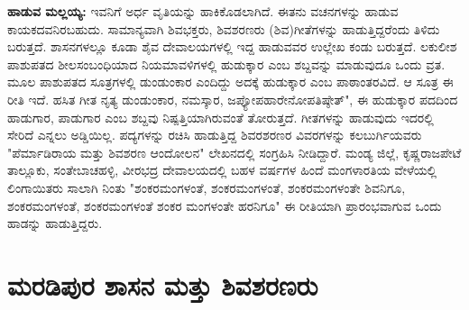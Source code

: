\textbf{ಹಾಡುವ ಮಲ್ಲಯ್ಯ:} ಇವನಿಗೆ ಅರ್ಧ ವೃತಿಯನ್ನು ಹಾಕಿಕೊಡಲಾಗಿದೆ. ಈತನು ವಚನಗಳನ್ನು ಹಾಡುವ ಕಾಯಕದವನಿರಬಹುದು. ಸಾಮಾನ್ಯವಾಗಿ ಶಿವಭಕ್ತರು, ಶಿವಶರಣರು (ಶಿವ)ಗೀತೆಗಳನ್ನು ಹಾಡುತ್ತಿದ್ದರೆಂದು ತಿಳಿದು ಬರುತ್ತದೆ. ಶಾಸನಗಳಲ್ಲೂ ಕೂಡಾ ಶೈವ ದೇವಾಲಯಗಳಲ್ಲಿ ಇದ್ದ ಹಾಡುವವರ ಉಲ್ಲೇಖ ಕಂಡು ಬರುತ್ತದೆ. ಲಕುಲೀಶ ಪಾಶುಪತದ ಶೀಲಸಂಬಂಧಿಯಾದ ನಿಯಮಾವಳಿಗಳಲ್ಲಿ ಹುಡುಕ್ಕಾರ ಎಂಬ ಶಬ್ದವನ್ನು ಮಾಡುವುದೂ ಒಂದು ವ್ರತ. ಮೂಲ ಪಾಶುಪತದ ಸೂತ್ರಗಳಲ್ಲಿ ಡುಂಡುಂಕಾರ ಎಂದಿದ್ದು ಅದಕ್ಕೆ ಹುಡುಕ್ಕಾರ ಎಂಬ ಪಾಠಾಂತರವಿದೆ. ಆ ಸೂತ್ರ ಈ ರೀತಿ ಇದೆ. ಹಸಿತ ಗೀತ ನೃತ್ಯ ಡುಂಡುಂಕಾರ, ನಮಸ್ಕಾರ, ಜಪ್ಯೋಪಹಾರೇನೋಪತಿಷ್ಠೇತ್​", ಈ ಹುಡುಕ್ಕಾರ ಪದದಿಂದ ಹಾಡುಗಾರ, ಪಾಡುಗಾರ ಎಂಬ ಶಬ್ದವು ನಿಷ್ಪತ್ತಿಯಾಗಿರುವಂತೆ ತೋರುತ್ತದೆ. ಗೀತಗಳನ್ನು ಹಾಡುವುದು ಇದರಲ್ಲಿ ಸೇರಿದೆ ಎನ್ನಲು ಅಡ್ಡಿಯಿಲ್ಲ. ಪದ್ಯಗಳನ್ನು ರಚಿಸಿ ಹಾಡುತ್ತಿದ್ದ ಶಿವರಶರಣರ ವಿವರಗಳನ್ನು ಕಲಬುರ್ಗಿಯವರು "ಪೆರ್ಮಾಡಿರಾಯ ಮತ್ತು ಶಿವಶರಣ ಆಂದೋಲನ" ಲೇಖನದಲ್ಲಿ ಸಂಗ್ರಹಿಸಿ ನೀಡಿದ್ದಾರೆ. ಮಂಡ್ಯ ಜಿಲ್ಲೆ, ಕೃಷ್ಣರಾಜಪೇಟೆ ತಾಲ್ಲೂಕು, ಸಂತೇಬಾಚಹಳ್ಳಿ, ವೀರಭದ್ರ ದೇವಾಲಯದಲ್ಲಿ ಬಹಳ ವರ್ಷಗಳ ಹಿಂದೆ ಮಂಗಳಾರತಿಯ ವೇಳೆಯಲ್ಲಿ ಲಿಂಗಾಯಿತರು ಸಾಲಾಗಿ ನಿಂತು "ಶಂಕರಮಂಗಳಂತೆ, ಶಂಕರಮಂಗಳಂತೆ, ಶಂಕರಮಂಗಳಂತೇ ಶಿವನಿಗೂ, ಶಂಕರಮಂಗಳಂತೆ, ಶಂಕರಮಂಗಳಂತೆ ಶಂಕರ ಮಂಗಳಂತೇ ಹರನಿಗೂ" ಈ ರೀತಿಯಾಗಿ ಪ್ರಾರಂಭವಾಗುವ ಒಂದು ಹಾಡನ್ನು ಹಾಡುತ್ತಿದ್ದರು.


\section{ಮರಡಿಪುರ ಶಾಸನ ಮತ್ತು ಶಿವಶರಣರು}


